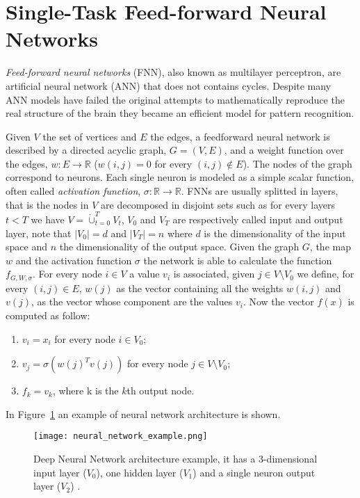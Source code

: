 \section{Single-Task Feed-forward Neural Networks} \label{sec:singletaskNN}
\emph{Feed-forward neural networks} (FNN), also known as multilayer perceptron, are artificial neural network (ANN) that does not contains cycles. Despite many ANN models have failed the original attempts to mathematically reproduce the real structure of the brain they became an efficient model for pattern recognition. 

Given $V$ the set of vertices and $E$ the edges, a feedforward neural network is described by a directed acyclic graph, $G =
(V,E)$, and a weight function over the edges, $w : E \to \mathbb R$ ($w(i, j) = 0$
for every $(i, j) \notin E$). The nodes of the graph correspond to neurons. Each
single neuron is modeled as a simple scalar function, often called \emph{activation function},  $ \sigma : \mathbb R \to
\mathbb R$. FNNs are usually
splitted in layers, that is the nodes in $V$ are decomposed in disjoint sets such
as for every layers $t < T$ we have $V = \dot\cup_{t = 0}^T V_t$, $V_0$ and
$V_T$ are respectively called input and output layer, note that $|V_0| = d$ and
$|V_T| = n$ where $d$ is the dimensionality of the input space and $n$ the
dimensionality of the output space. Given the graph $G$, the map $w$ and the
activation function $\sigma$ the network is able to calculate the function
$f_{G,W,\sigma}$. For every node $i \in V$ a value $v_i$ is associated, given $j
\in V \setminus V_0$ we define, for every $(i, j) \in E$, $w(j)$ as the vector containing all the weights $w(i, j)$  and $v(j)$, as the vector whose component are the values $v_i$. Now the vector $f(x)$ is computed as
follow:
\begin{enumerate}
    \item $v_i = x_i$ for every node $i \in V_0$;
    \item $v_j = \sigma(w(j)^T v(j))$ for every node $j \in V \setminus V_0$;
    \item $f_k = v_k$, where k is the $k$th output node.
\end{enumerate}
In Figure~\ref{fig:neural_network_example} an example of neural network architecture is shown. \cite{ShwartzUnderstadningML, BishopML}
\begin{figure}[ht]
\texttt{[image: neural\_network\_example.png]}
\caption{Deep Neural Network architecture example, it has a 3-dimensional input layer ($V_0$), one hidden layer ($V_1$) and a single neuron output layer ($V_2$) \cite{ShwartzUnderstadningML}.} 
\label{fig:neural_network_example}
\end{figure}

